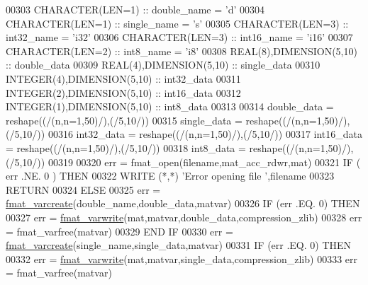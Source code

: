 \begin{DoxyCode}
{00303         \textcolor{keywordtype}{CHARACTER(LEN=1)}           :: double\_name = \textcolor{stringliteral}{'d'}
00304         \textcolor{keywordtype}{CHARACTER(LEN=1)}           :: single\_name = \textcolor{stringliteral}{'s'}
00305         \textcolor{keywordtype}{CHARACTER(LEN=3)}           :: int32\_name  = \textcolor{stringliteral}{'i32'}
00306         \textcolor{keywordtype}{CHARACTER(LEN=3)}           :: int16\_name  = \textcolor{stringliteral}{'i16'}
00307         \textcolor{keywordtype}{CHARACTER(LEN=2)}           :: int8\_name   = \textcolor{stringliteral}{'i8'}
00308         \textcolor{keywordtype}{REAL(8)},\textcolor{keywordtype}{DIMENSION(5,10)}    :: double\_data
00309         \textcolor{keywordtype}{REAL(4)},\textcolor{keywordtype}{DIMENSION(5,10)}    :: single\_data
00310         \textcolor{keywordtype}{INTEGER(4)},\textcolor{keywordtype}{DIMENSION(5,10)} :: int32\_data
00311         \textcolor{keywordtype}{INTEGER(2)},\textcolor{keywordtype}{DIMENSION(5,10)} :: int16\_data
00312         \textcolor{keywordtype}{INTEGER(1)},\textcolor{keywordtype}{DIMENSION(5,10)} :: int8\_data
00313 
00314         double\_data = reshape((/(n,n=1,50)/),(/5,10/))
00315         single\_data = reshape((/(n,n=1,50)/),(/5,10/))
00316         int32\_data  = reshape((/(n,n=1,50)/),(/5,10/))
00317         int16\_data  = reshape((/(n,n=1,50)/),(/5,10/))
00318         int8\_data   = reshape((/(n,n=1,50)/),(/5,10/))
00319 
00320         err = fmat\_open(filename,mat\_acc\_rdwr,mat)
00321         \textcolor{keywordflow}{IF} ( err .NE. 0 ) \textcolor{keywordflow}{THEN}
00322             \textcolor{keyword}{WRITE} (*,*) \textcolor{stringliteral}{'Error opening file '},filename
00323             \textcolor{keywordflow}{RETURN}
00324         \textcolor{keywordflow}{ELSE}
00325             err = \hyperlink{interfacematio_1_1fmat__varcreate}{fmat\_varcreate}(double\_name,double\_data,matvar)
00326             \textcolor{keywordflow}{IF} (err .EQ. 0) \textcolor{keywordflow}{THEN}
00327                 err = \hyperlink{interfacematio_1_1fmat__varwrite}{fmat\_varwrite}(mat,matvar,double\_data,compression\_zlib)
00328                 err = fmat\_varfree(matvar)
00329 \textcolor{keywordflow}{            END IF}
00330             err = \hyperlink{interfacematio_1_1fmat__varcreate}{fmat\_varcreate}(single\_name,single\_data,matvar)
00331             \textcolor{keywordflow}{IF} (err .EQ. 0) \textcolor{keywordflow}{THEN}
00332                 err = \hyperlink{interfacematio_1_1fmat__varwrite}{fmat\_varwrite}(mat,matvar,single\_data,compression\_zlib)
00333                 err = fmat\_varfree(matvar)
}
\end{DoxyCode}
